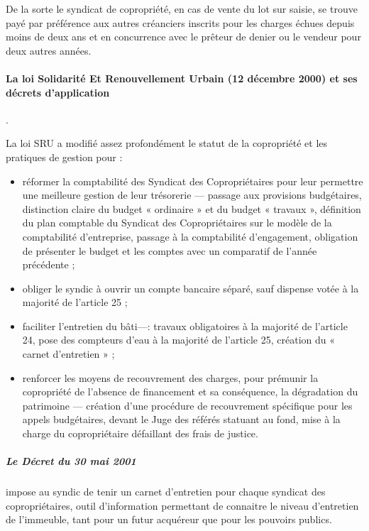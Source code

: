 				De la sorte le syndicat de copropriété, en cas de vente du lot sur saisie, se trouve payé par préférence aux autres créanciers inscrits pour les charges échues depuis moins de deux ans et en concurrence avec le prêteur de denier ou le vendeur pour deux autres années.
				
				\paragraph{La loi Solidarité Et Renouvellement Urbain (12 décembre 2000) et ses décrets d’application}.
				
				La loi SRU a modifié assez profondément le statut de la copropriété et les pratiques de gestion pour :
				\begin{itemize}
					\item 	réformer la comptabilité des Syndicat des Copropriétaires pour leur permettre une meilleure gestion de leur trésorerie --- passage aux provisions budgétaires, distinction claire du budget « ordinaire » et du budget « travaux », définition du plan comptable du Syndicat des Copropriétaires sur le modèle de la comptabilité d’entreprise, passage à la comptabilité d’engagement, obligation de présenter le budget et les comptes avec un comparatif de l’année précédente ;
					
					\item  obliger le syndic à ouvrir un compte bancaire séparé, sauf dispense votée à la majorité de l’article 25 ;
					
					\item  faciliter l’entretien du bâti---: travaux obligatoires à la majorité de l’article 24, pose des compteurs d’eau à la majorité de l’article 25, création du « carnet d’entretien » ;
					
					\item  renforcer les moyens de recouvrement des charges, pour prémunir la copropriété de l'absence de financement et sa conséquence, la dégradation du patrimoine --- création d’une procédure de recouvrement spécifique pour les appels budgétaires, devant le Juge des référés statuant au fond, mise à la charge du copropriétaire défaillant des frais de justice.
				\end{itemize}
			
				\subparagraph{Le Décret du 30 mai 2001} impose au syndic de tenir un carnet d’entretien pour chaque syndicat des copropriétaires, outil d’information permettant de connaitre le niveau d’entretien de l’immeuble, tant pour un futur acquéreur que pour les pouvoirs publics.
				
